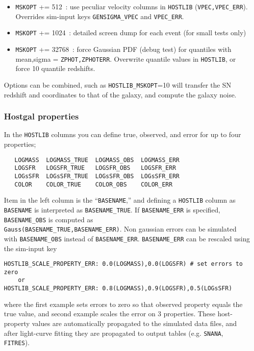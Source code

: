 \documentclass[12pt]{article}
\begin{document}
{\begin{itemize}
%
\item {\tt MSKOPT} += 512~: use peculiar velocity columns in {\tt HOSTLIB}
       ({\tt VPEC,VPEC\_ERR}). \\
       Overrides sim-input keys {\tt GENSIGMA\_VPEC} and {\tt VPEC\_ERR}.
%
\item {\tt MSKOPT} += 1024~: detailed screen dump
        for each event (for small tests only)
%
\item {\tt MSKOPT} += 32768~: force Gaussian PDF (debug test) for quantiles with
        mean,sigma = {\tt ZPHOT,ZPHOTERR}. Overwrite quantile values in 
        {\tt HOSTLIB}, or force 10 quantile redshifts.
%
\end{itemize}
%
Options can be combined, such as {\tt HOSTLIB\_MSKOPT}=10
will transfer the SN redshift and coordinates to that of
the galaxy, and compute the galaxy noise.

\subsubsection{Hostgal properties}
\label{sss:hostgal_properties}
In the {\tt HOSTLIB} columns you can define true, observed, and error 
for up to four properties;
\begin{verbatim}
   LOGMASS  LOGMASS_TRUE  LOGMASS_OBS  LOGMASS_ERR 
   LOGSFR   LOGSFR_TRUE   LOGSFR_OBS   LOGSFR_ERR
   LOGsSFR  LOGsSFR_TRUE  LOGsSFR_OBS  LOGsSFR_ERR
   COLOR    COLOR_TRUE    COLOR_OBS    COLOR_ERR
\end{verbatim}
%
Item in the left column is the ``{\tt BASENAME},'' and defining a {\tt HOSTLIB}
column as {\tt BASENAME} is interpreted as {\tt BASENAME\_TRUE}.
If {\tt BASENAME\_ERR} is specified, {\tt BASENAME\_OBS} is computed as \\
%
{\tt Gauss(BASENAME\_TRUE,BASENAME\_ERR)}.
%
Non gaussian errors can be simulated with {\tt BASENAME\_OBS} 
instead of {\tt BASENAME\_ERR}.
{\tt BASENAME\_ERR} can be rescaled using the sim-input key 
\begin{verbatim}    
HOSTLIB_SCALE_PROPERTY_ERR: 0.0(LOGMASS),0.0(LOGSFR) # set errors to zero
    or
HOSTLIB_SCALE_PROPERTY_ERR: 0.8(LOGMASS),0.9(LOGSFR),0.5(LOGsSFR)  
\end{verbatim}
%
where the first example sets errors to zero so that observed property 
equals the true value, and second example scales the error on 3 properties.
%
These host-property values are automatically propagated to the simulated data 
files, and after light-curve fitting they are propagated to output tables 
(e.g. {\tt SNANA}, {\tt FITRES}).

}
\end{document}
